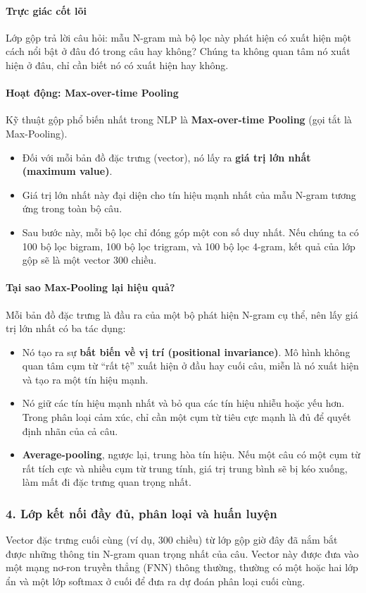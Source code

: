 \paragraph{Trực giác cốt lõi}
Lớp gộp trả lời câu hỏi: mẫu N-gram mà bộ lọc này phát hiện có xuất hiện một cách nổi bật ở đâu đó trong câu hay không? Chúng ta không quan tâm nó xuất hiện ở đâu, chỉ cần biết nó có xuất hiện hay không.

\paragraph{Hoạt động: Max-over-time Pooling}
Kỹ thuật gộp phổ biến nhất trong NLP là \textbf{Max-over-time Pooling} (gọi tắt là Max-Pooling).
\begin{itemize}
    \item Đối với mỗi bản đồ đặc trưng (vector), nó lấy ra \textbf{giá trị lớn nhất (maximum value)}.
    \item Giá trị lớn nhất này đại diện cho tín hiệu mạnh nhất của mẫu N-gram tương ứng trong toàn bộ câu.
    \item Sau bước này, mỗi bộ lọc chỉ đóng góp một con số duy nhất. Nếu chúng ta có 100 bộ lọc bigram, 100 bộ lọc trigram, và 100 bộ lọc 4-gram, kết quả của lớp gộp sẽ là một vector 300 chiều.
\end{itemize}
\paragraph{Tại sao Max-Pooling lại hiệu quả?}
Mỗi bản đồ đặc trưng là đầu ra của một bộ phát hiện N-gram cụ thể, nên lấy giá trị lớn nhất có ba tác dụng:
\begin{itemize}
    \item Nó tạo ra sự \textbf{bất biến về vị trí (positional invariance)}. Mô hình không quan tâm cụm từ “rất tệ” xuất hiện ở đầu hay cuối câu, miễn là nó xuất hiện và tạo ra một tín hiệu mạnh.
    \item Nó giữ các tín hiệu mạnh nhất và bỏ qua các tín hiệu nhiễu hoặc yếu hơn. Trong phân loại cảm xúc, chỉ cần một cụm từ tiêu cực mạnh là đủ để quyết định nhãn của cả câu.
    \item \textbf{Average-pooling}, ngược lại, trung hòa tín hiệu. Nếu một câu có một cụm từ rất tích cực và nhiều cụm từ trung tính, giá trị trung bình sẽ bị kéo xuống, làm mất đi đặc trưng quan trọng nhất.
\end{itemize}
\subsubsection{4. Lớp kết nối đầy đủ, phân loại và huấn luyện}
Vector đặc trưng cuối cùng (ví dụ, 300 chiều) từ lớp gộp giờ đây đã nắm bắt được những thông tin N-gram quan trọng nhất của câu. Vector này được đưa vào một mạng nơ-ron truyền thẳng (FNN) thông thường, thường có một hoặc hai lớp ẩn và một lớp softmax ở cuối để đưa ra dự đoán phân loại cuối cùng.

